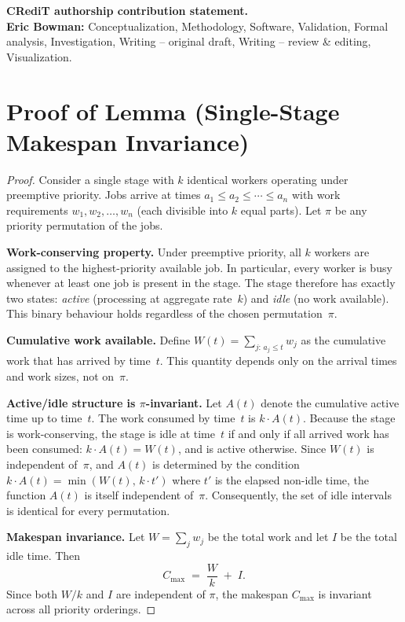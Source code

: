 \documentclass[11pt,titlepage]{article}
\begin{document}
\textbf{CRediT authorship contribution statement.}\\
\textbf{Eric Bowman:} Conceptualization, Methodology, Software,
Validation, Formal analysis, Investigation, Writing -- original draft,
Writing -- review \& editing, Visualization.


\appendix

\section{Proof of Lemma (Single-Stage Makespan Invariance)}
\label{app:makespan-invariance}

\begin{proof}
Consider a single stage with $k$ identical workers operating under
preemptive priority. Jobs arrive at times $a_1 \le a_2 \le \cdots \le a_n$
with work requirements $w_1, w_2, \ldots, w_n$ (each divisible into $k$
equal parts). Let $\pi$ be any priority permutation of the jobs.

\medskip\noindent\textbf{Work-conserving property.}\quad
Under preemptive priority, all $k$ workers are assigned to the
highest-priority available job. In particular, every worker is busy
whenever at least one job is present in the stage. The stage therefore
has exactly two states: \emph{active} (processing at aggregate
rate~$k$) and \emph{idle} (no work available). This binary behaviour
holds regardless of the chosen permutation~$\pi$.

\medskip\noindent\textbf{Cumulative work available.}\quad
Define $W(t) = \sum_{j:\, a_j \le t} w_j$ as the cumulative work that
has arrived by time~$t$. This quantity depends only on the arrival
times and work sizes, not on~$\pi$.

\medskip\noindent\textbf{Active/idle structure is $\pi$-invariant.}\quad
Let $A(t)$ denote the cumulative active time up to time~$t$. The work
consumed by time~$t$ is $k \cdot A(t)$. Because the stage is
work-conserving, the stage is idle at time~$t$ if and only if all
arrived work has been consumed: $k \cdot A(t) = W(t)$, and is active
otherwise. Since $W(t)$ is independent of~$\pi$, and $A(t)$ is
determined by the condition $k \cdot A(t) = \min(W(t),\, k \cdot t')$
where $t'$ is the elapsed non-idle time, the function $A(t)$ is
itself independent of~$\pi$. Consequently, the set of idle intervals
is identical for every permutation.

\medskip\noindent\textbf{Makespan invariance.}\quad
Let $W = \sum_j w_j$ be the total work and let $I$ be the total idle
time. Then
\[
  C_{\max} \;=\; \frac{W}{k} \;+\; I.
\]
Since both $W/k$ and $I$ are independent of $\pi$, the makespan
$C_{\max}$ is invariant across all priority orderings.
\end{proof}
\end{document}

